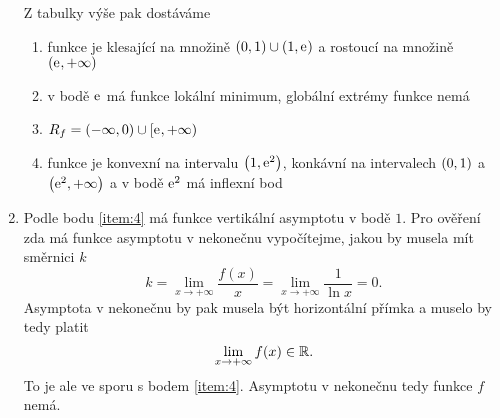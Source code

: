 \documentclass[answers]{exam}
\begin{document}
\begin{questions}
\begin{solution}
\begin{enumerate}
    		Z tabulky výše pak dostáváme
    		\begin{enumerate}
    			\item funkce je klesající na množině $\parens{0, 1} \cup \parens{1, \exponential{}}$ a rostoucí na množině $\parens{\exponential{}, +\infty}$
    			\item v bodě $\mathrm{e}^{}$ má funkce lokální minimum, globální extrémy funkce nemá
    			\item $R_f = \parens{-\infty, 0} \cup [\exponential{}, +\infty)$
    			\item funkce je konvexní na intervalu $\parens{1,\exponential{2}}$, konkávní na intervalech $\parens{0, 1}$ a $\parens{\exponential{2}, +\infty}$ a v bodě $\mathrm{e}^{2}$ má inflexní bod
    		\end{enumerate}
    		
    		\item Podle bodu \ref{item:4} má funkce vertikální asymptotu v bodě $1$. Pro ověření zda má funkce asymptotu v nekonečnu vypočítejme, jakou by musela mít směrnici $k$
    		\begin{equation*}
    			k 
    			= 
    			\lim_{x \to +\infty} \frac{f(x)}{x}
    			=
    			\lim_{x \to +\infty} \frac{1}{\ln x}
    			=
    			0. 
    		\end{equation*}
    		Asymptota v nekonečnu by pak musela být horizontální přímka a muselo by tedy platit
    		\begin{equation*}
    		 \lim_{x \to +\infty} f(x) \in \mathbb{R}.
    		\end{equation*}
    		To je ale ve sporu s bodem \ref{item:4}. Asymptotu v nekonečnu tedy funkce $f$ nemá.
    		

\end{enumerate}
\end{solution}
\end{questions}
\end{document}
